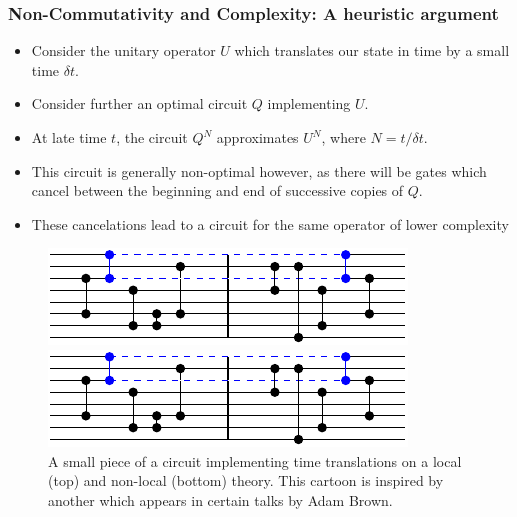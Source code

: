 \documentclass[8pt,aspectratio=169]{beamer}
\begin{document}
\begin{frame}
\frametitle{Non-Commutativity and Complexity: A heuristic argument}

\begin{minipage}[t]{0.5\linewidth}

\begin{itemize}

\item Consider the unitary operator $U$ which translates our state in time by a small time $\delta t$. 

\item Consider further an optimal circuit $Q$ implementing $U$.

\item At late time $t$, the circuit $Q^N$ approximates $U^N$, where $N= t/\delta t$.

\item This circuit is generally non-optimal however, as there will be gates which cancel between the beginning and end of successive copies of $Q$.

\item These cancelations lead to a circuit for the same operator of lower complexity

\end{itemize}

\end{minipage}\hfill
%
\begin{minipage}[t]{0.48\linewidth}

\begin{figure}
    \begin{center}
    
        \includegraphics[scale=1]{animation/animation_3}    
        
        \vspace{2mm}
        
        \includegraphics[scale=1]{animation/animation_3}    
    
    \end{center}
    \caption{A small piece of a circuit implementing time translations on a local (top) and non-local (bottom) theory. This cartoon is inspired by another which appears in certain talks by Adam Brown.}
\end{figure}

\end{minipage}

\end{frame}
\end{document}
